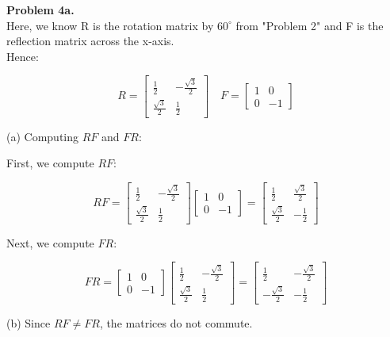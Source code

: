 \documentclass{ximera}
\begin{document}
\begin{problem} 
\textbf{Problem 4a.}\\
  Here, we know R is the rotation matrix by $60^\circ$ from "Problem 2" and F is the reflection matrix across the x-axis.\\
  Hence:

 $$ R =
\begin{bmatrix}
\frac{1}{2} & -\frac{\sqrt{3}}{2} \\
\frac{\sqrt{3}}{2} & \frac{1}{2}
\end{bmatrix} \quad 
F =
\begin{bmatrix}
1 & 0 \\
0 & -1
\end{bmatrix}$$
  
  (a) Computing $RF$ and $FR$:\\
  
  \vspace{0.04cm}
  
    First, we compute $RF$:

  \vspace{0.3cm}

$$RF =
\begin{bmatrix}
\frac{1}{2} & -\frac{\sqrt{3}}{2} \\
\frac{\sqrt{3}}{2} & \frac{1}{2}
\end{bmatrix}
\begin{bmatrix}
1 & 0 \\
0 & -1
\end{bmatrix}
=
\begin{bmatrix}
\frac{1}{2} & \frac{\sqrt{3}}{2} \\
\frac{\sqrt{3}}{2} & -\frac{1}{2}
\end{bmatrix}$$

Next, we compute $FR$:

$$FR =
\begin{bmatrix}
1 & 0 \\
0 & -1
\end{bmatrix}
\begin{bmatrix}
\frac{1}{2} & -\frac{\sqrt{3}}{2} \\
\frac{\sqrt{3}}{2} & \frac{1}{2}
\end{bmatrix}
=
\begin{bmatrix}
\frac{1}{2} & -\frac{\sqrt{3}}{2} \\
-\frac{\sqrt{3}}{2} & -\frac{1}{2}
\end{bmatrix}$$

(b) Since $RF \neq FR$, the matrices do not commute.


\end{problem}
\end{document}

